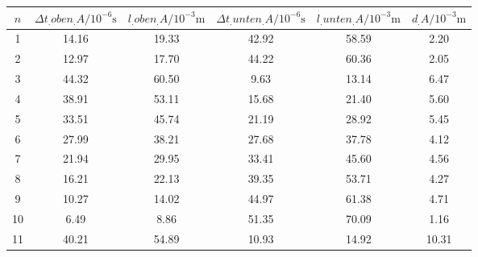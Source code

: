 \label{tab:tabAScan2MHz}
	\begin{tabular}{S[table-format=1.0]S[table-format=2.2]S[table-format=2.2]S[table-format=2.2]S[table-format=2.2]S[table-format=2.2]}
		\toprule
		{$n$} & {$\Delta t_.{oben_.{A}}/10^{-6}\si{\second}$} & {$l_.{oben_.{A}}/10^{-3}\si{\metre}$} & {$\Delta t_.{unten_.{A}}/10^{-6}\si{\second}$} & {$l_.{unten_.{A}}/10^{-3}\si{\metre}$} & {$d_.{A}/10^{-3}\si{\metre}$} \\
		 & 14.16 & 19.33 & 42.92 & 58.59 & 2.20 \\
		2 & 12.97 & 17.70 & 44.22 & 60.36 & 2.05 \\
		3 & 44.32 & 60.50 & 9.63 & 13.14 & 6.47 \\
		4 & 38.91 & 53.11 & 15.68 & 21.40 & 5.60 \\
		5 & 33.51 & 45.74 & 21.19 & 28.92 & 5.45 \\
		6 & 27.99 & 38.21 & 27.68 & 37.78 & 4.12 \\
		7 & 21.94 & 29.95 & 33.41 & 45.60 & 4.56 \\
		8 & 16.21 & 22.13 & 39.35 & 53.71 & 4.27 \\
		9 & 10.27 & 14.02 & 44.97 & 61.38 & 4.71 \\
		10 & 6.49 & 8.86 & 51.35 & 70.09 & 1.16 \\
		11 & 40.21 & 54.89 & 10.93 & 14.92 & 10.31 \\
		\bottomrule
	\end{tabular}
